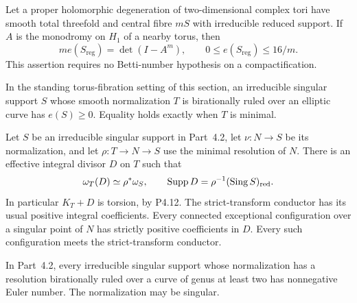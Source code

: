 
\begin{proposition}[P4.13]\hypertarget{tag-02WK}{}\label{night:P4.13}\label{stmt:P4.13}


Let a proper holomorphic degeneration of two-dimensional complex
tori have smooth total threefold and central fibre $mS$ with
irreducible reduced support. If $A$ is the monodromy on $H_1$ of
a nearby torus, then
\[
 m e(S_{\mathrm{reg}})=\det(I-A^m),\qquad
 0\le e(S_{\mathrm{reg}})\le16/m.
\]
This assertion requires no Betti-number hypothesis on a compactification.
\end{proposition}

\begin{proposition}[P4.22]\hypertarget{tag-02WU}{}\label{night:P4.22}\label{stmt:P4.22}


In the standing torus-fibration setting of this section, an irreducible singular support
$S$ whose smooth normalization $T$ is birationally ruled
over an elliptic curve has $e(S)\ge0$. Equality holds
exactly when $T$ is minimal.
\end{proposition}

\begin{proposition}[P4R.6]\hypertarget{tag-02YI}{}\label{night:P4R.6}\label{stmt:P4R.6}


Let $S$ be an irreducible singular support in
Part~4.2, let $\nu:N\to S$ be its normalization,
and let $\rho:T\to N\to S$ use the minimal
resolution of $N$. There is an effective integral
divisor $D$ on $T$ such that
\[
 \omega_T(D)\simeq\rho^*\omega_S,
 \qquad \operatorname{Supp}D
       =\rho^{-1}(\operatorname{Sing}S)_{\rm red}.
\]
In particular $K_T+D$ is torsion, by P4.12.
The strict-transform conductor has its usual
positive integral coefficients. Every connected
exceptional configuration over a singular point
of $N$ has strictly positive coefficients in $D$.
Every such configuration meets the strict-transform
conductor.
\end{proposition}

\begin{proposition}[P4R.7]\hypertarget{tag-02YJ}{}\label{night:P4R.7}\label{stmt:P4R.7}


In Part~4.2, every irreducible singular
support whose normalization has a
resolution birationally ruled over a
curve of genus at least two has
nonnegative Euler number. The
normalization may be singular.
\end{proposition}

